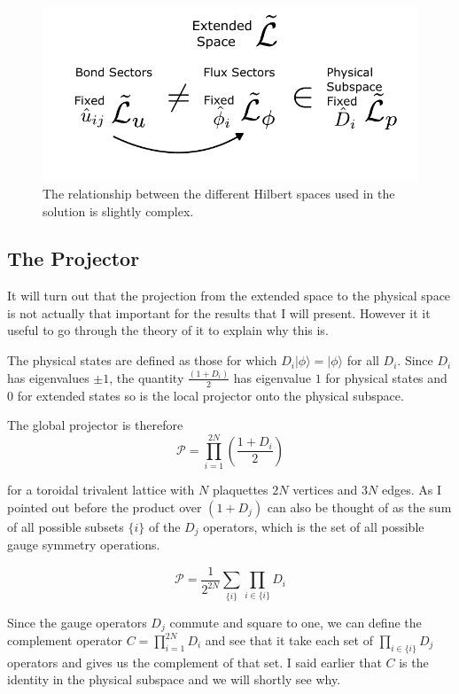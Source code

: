 \begin{figure}
\hypertarget{fig:hilbert_spaces}{%
\centering
\includegraphics[width=1\textwidth,height=\textheight]{figure_code/amk_chapter/hilbert_spaces.pdf}
\caption{The relationship between the different Hilbert spaces used in the solution is slightly complex.}\label{fig:hilbert_spaces}
}
\end{figure}

\hypertarget{the-projector}{%
\subsection{The Projector}\label{the-projector}}

It will turn out that the projection from the extended space to the physical space is not actually that important for the results that I will present. However it it useful to go through the theory of it to explain why this is.

The physical states are defined as those for which \(D_i |\phi\rangle = |\phi\rangle\) for all \(D_i\). Since \(D_i\) has eigenvalues \(\pm1\), the quantity \(\tfrac{(1+D_i)}{2}\) has eigenvalue \(1\) for physical states and \(0\) for extended states so is the local projector onto the physical subspace.

The global projector is therefore \[ \mathcal{P} = \prod_{i=1}^{2N} \left( \frac{1 + D_i}{2}\right)\]

for a toroidal trivalent lattice with \(N\) plaquettes \(2N\) vertices and \(3N\) edges. As I pointed out before the product over \((1 + D_j)\) can also be thought of as the sum of all possible subsets \(\{i\}\) of the \(D_j\) operators, which is the set of all possible gauge symmetry operations.

\[ \mathcal{P} = \frac{1}{2^{2N}} \sum_{\{i\}} \prod_{i\in\{i\}} D_i\]

Since the gauge operators \(D_j\) commute and square to one, we can define the complement operator \(C = \prod_{i=1}^{2N} D_i\) and see that it take each set of \(\prod_{i \in \{i\}} D_j\) operators and gives us the complement of that set. I said earlier that \(C\) is the identity in the physical subspace and we will shortly see why.

